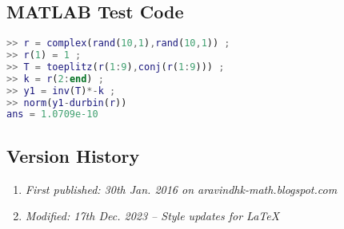 \subsection{MATLAB Test Code}
\begin{lstlisting}[language=MATLAB,numbers=none]
>> r = complex(rand(10,1),rand(10,1)) ;
>> r(1) = 1 ;
>> T = toeplitz(r(1:9),conj(r(1:9))) ;
>> k = r(2:end) ;
>> y1 = inv(T)*-k ;
>> norm(y1-durbin(r))
ans = 1.0709e-10
\end{lstlisting}

\subsection{Version History}
\begin{enumerate}
	\item \emph{First published: 30th Jan. 2016 on aravindhk-math.blogspot.com}
	\item \emph{Modified: 17th Dec. 2023 -- Style updates for \LaTeX}
\end{enumerate}

